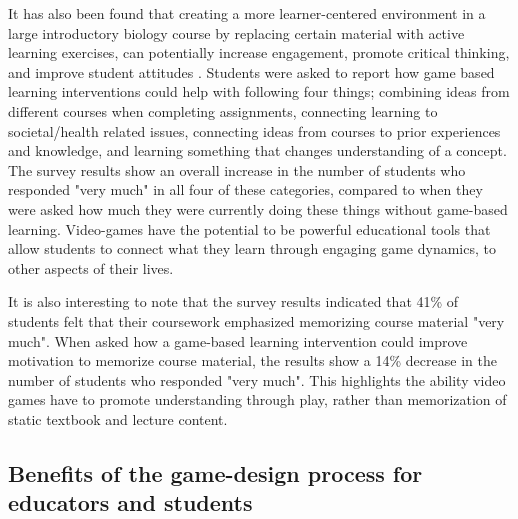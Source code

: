 \documentclass[10pt]{article}
\begin{document}
It has also been found that creating a more learner-centered environment in a large introductory biology course by replacing certain material with active learning exercises, can potentially increase engagement, promote critical thinking, and improve student attitudes \citep{moravec2010learn, o2009garage}. Students were asked to report how game based learning interventions could help with following four things; combining ideas from different courses when completing assignments, connecting learning to societal/health related issues, connecting ideas from courses to prior experiences and knowledge, and learning something that changes understanding of a concept. The survey results show an overall increase in the number of students who responded "very much" in all four of these categories, compared to when they were asked how much they were currently doing these things without game-based learning. Video-games have the potential to be powerful educational tools that allow students to connect what they learn through engaging game dynamics, to other aspects of their lives.

It is also interesting to note that the survey results indicated that 41\% of students felt that their coursework emphasized memorizing course material "very much". When asked how a game-based learning intervention could improve motivation to memorize course material, the results show a 14\% decrease in the number of students who responded "very much". This highlights the ability video games have to promote understanding through play, rather than memorization of static textbook and lecture content.

\subsection{Benefits of the game-design process for educators and students}
\end{document}
